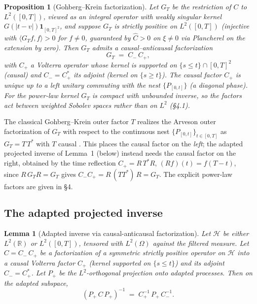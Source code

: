 \documentclass[11pt]{article}
\newcommand{\R}{\mathbb{R}}
\newcommand{\Hilb}{\mathcal{H}}
\theoremstyle{plain}
\newtheorem{proposition}{Proposition}
\newtheorem{lemma}{Lemma}
\begin{document}
\begin{proposition}[Gohberg--Krein factorization]
Let $G_T$ be the restriction of $C$ to $L^2([0,T])$, viewed as an integral operator with weakly singular kernel $G(|t-v|)\mathbf{1}_{[0,T]^2}$, and suppose $G_T$ is strictly positive on $L^2([0,T])$ (injective with $\langle G_T f,f\rangle>0$ for $f\ne0$, guaranteed by $\hat C>0$ on $\xi\ne0$ via Plancherel on the extension by zero). Then $G_T$ admits a causal--anticausal factorization
\begin{equation}\label{eq:gt-factor}
G_T \;=\; C_-\, C_+,
\end{equation}
with $C_+$ a Volterra operator whose kernel is supported on $\{s\le t\}\cap[0,T]^2$ (causal) and $C_- = C_+^*$ its adjoint (kernel on $\{s\ge t\}$). The causal factor $C_+$ is unique up to a left unitary commuting with the nest $\{P_{[0,t]}\}$ (a diagonal phase). For the power-law kernel $G_T$ is compact with unbounded inverse, so the factors act between weighted Sobolev spaces rather than on $L^2$ (\S4.1).
\end{proposition}

The classical Gohberg--Krein outer factor $T$ realizes the Arveson outer factorization of $G_T$ with respect to the continuous nest $\{P_{[0,t]}\}_{t\in[0,T]}$ as $G_T = T\,T^*$ with $T$ causal \citep[Thm~4.4.2]{Arveson1975}\citep[Ex.~6.2/9.2]{PorterStirling1990}. This places the causal factor on the \emph{left}; the adapted projected inverse of Lemma~1 (below) instead needs the causal factor on the right, obtained by the time reflection $C_+ = R\,T^*R$, $(Rf)(t)=f(T-t)$, since $R\,G_T R = G_T$ gives $C_-C_+ = R\,(TT^*)\,R = G_T$. The explicit power-law factors are given in \S4.

\subsection{The adapted projected inverse}

\begin{lemma}[Adapted inverse via causal-anticausal factorization]
Let $\Hilb$ be either $L^2(\R)$ or $L^2([0,T])$, tensored with $L^2(\Omega)$ against the filtered measure. Let $C = C_-\, C_+$ be a factorization of a symmetric strictly positive operator on $\Hilb$ into a causal Volterra factor $C_+$ (kernel supported on $\{s\le t\}$) and its adjoint $C_- = C_+^*$. Let $P_+$ be the $L^2$-orthogonal projection onto adapted processes. Then on the adapted subspace,
\begin{equation}\label{eq:pi-identity}
(P_+\, C\, P_+)^{-1} \;=\; C_+^{-1}\, P_+\, C_-^{-1}.
\end{equation}
\end{lemma}
\end{document}
